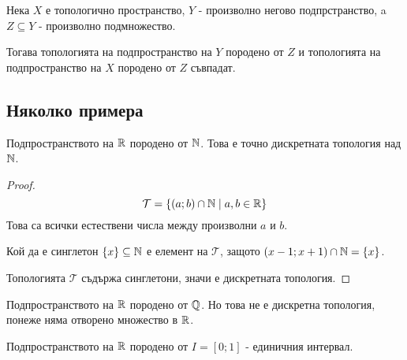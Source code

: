 \begin{proposition}
    Нека $X$ е топологично пространство, $Y$ - произволно негово подпрстранство, a $Z \subseteq Y$ - произволно подмножество.

    Тогава топологията на подпространство на $Y$ породено от $Z$ и топологията на подпространство на $X$ породено от $Z$ съвпадат.
\end{proposition}

\subsection{Няколко примера}
\begin{example}
    Подпространството на ${\mathbb{R}}$ породено от ${\mathbb{N}}$. Това е точно дискретната топология над ${\mathbb{N}}$.
\end{example}
\begin{proof}
    \begin{equation}
        \mathcal T = \left\{(a; b) \cap {\mathbb{N}} \mid a, b \in {\mathbb{R}}\right\}
    \end{equation}
    Това са всички естествени числа между произволни $a$ и $b$.

    Кой да е синглетон $\{x\} \subseteq {\mathbb{N}}$ е елемент на $\mathcal T$, защото $(x-1;x+1) \cap {\mathbb{N}} = \{x\}$.

    Топологията $\mathcal T$ съдържа синглетони, значи е дискретната топология.
\end{proof}
\begin{example}
    Подпространството на ${\mathbb{R}}$ породено от ${\mathbb{Q}}$. Но това не е дискретна топология, понеже няма отворено множество в ${\mathbb{R}}$. 
\end{example}
\begin{example}
    Подпространството на ${\mathbb{R}}$ породено от $I = [0; 1]$ - единичния интервал.
\end{example}
